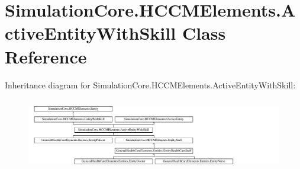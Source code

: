 \hypertarget{class_simulation_core_1_1_h_c_c_m_elements_1_1_active_entity_with_skill}{}\section{Simulation\+Core.\+H\+C\+C\+M\+Elements.\+Active\+Entity\+With\+Skill Class Reference}
\label{class_simulation_core_1_1_h_c_c_m_elements_1_1_active_entity_with_skill}
Inheritance diagram for Simulation\+Core.\+H\+C\+C\+M\+Elements.\+Active\+Entity\+With\+Skill\+:\begin{figure}[H]
\begin{center}
\leavevmode
\includegraphics[height=3.218391cm]{class_simulation_core_1_1_h_c_c_m_elements_1_1_active_entity_with_skill}
\end{center}
\end{figure}
